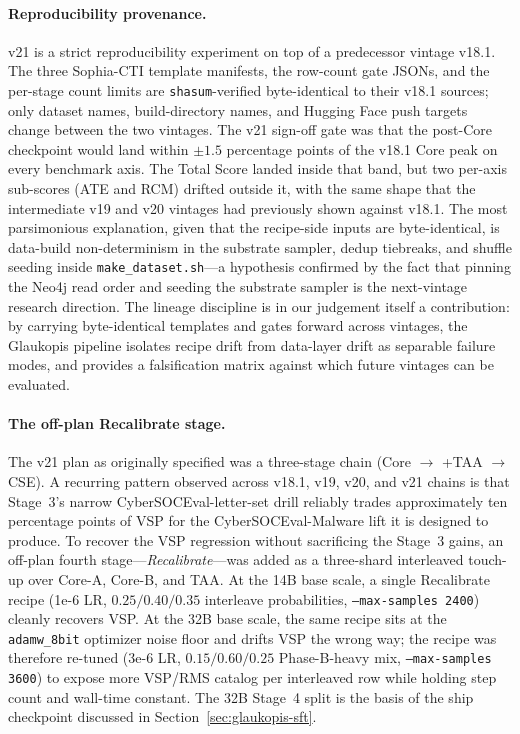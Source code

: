 \documentclass[unnumsec,webpdf,contemporary,large]{oup-authoring-template}
\theoremstyle{thmstyleone}
\theoremstyle{thmstyletwo}
\theoremstyle{thmstylethree}
\begin{document}
\paragraph{Reproducibility provenance.}
v21 is a strict reproducibility experiment on top of a predecessor vintage v18.1. The three Sophia-CTI template manifests, the row-count gate JSONs, and the per-stage count limits are \texttt{shasum}-verified byte-identical to their v18.1 sources; only dataset names, build-directory names, and Hugging Face push targets change between the two vintages. The v21 sign-off gate was that the post-Core checkpoint would land within $\pm 1.5$ percentage points of the v18.1 Core peak on every benchmark axis. The Total Score landed inside that band, but two per-axis sub-scores (ATE and RCM) drifted outside it, with the same shape that the intermediate v19 and v20 vintages had previously shown against v18.1. The most parsimonious explanation, given that the recipe-side inputs are byte-identical, is data-build non-determinism in the substrate sampler, dedup tiebreaks, and shuffle seeding inside \texttt{make\_dataset.sh}---a hypothesis confirmed by the fact that pinning the Neo4j read order and seeding the substrate sampler is the next-vintage research direction. The lineage discipline is in our judgement itself a contribution: by carrying byte-identical templates and gates forward across vintages, the Glaukopis pipeline isolates recipe drift from data-layer drift as separable failure modes, and provides a falsification matrix against which future vintages can be evaluated.

\paragraph{The off-plan Recalibrate stage.}
The v21 plan as originally specified was a three-stage chain (Core $\to$ +TAA $\to$ CSE). A recurring pattern observed across v18.1, v19, v20, and v21 chains is that Stage~3's narrow CyberSOCEval-letter-set drill reliably trades approximately ten percentage points of VSP for the CyberSOCEval-Malware lift it is designed to produce. To recover the VSP regression without sacrificing the Stage~3 gains, an off-plan fourth stage---\emph{Recalibrate}---was added as a three-shard interleaved touch-up over Core-A, Core-B, and TAA. At the 14B base scale, a single Recalibrate recipe (1e-6 LR, $0.25 / 0.40 / 0.35$ interleave probabilities, \texttt{--max-samples 2400}) cleanly recovers VSP. At the 32B base scale, the same recipe sits at the \texttt{adamw\_8bit} optimizer noise floor and drifts VSP the wrong way; the recipe was therefore re-tuned (3e-6 LR, $0.15 / 0.60 / 0.25$ Phase-B-heavy mix, \texttt{--max-samples 3600}) to expose more VSP/RMS catalog per interleaved row while holding step count and wall-time constant. The 32B Stage~4 split is the basis of the ship checkpoint discussed in Section~\ref{sec:glaukopis-sft}.
\end{document}
